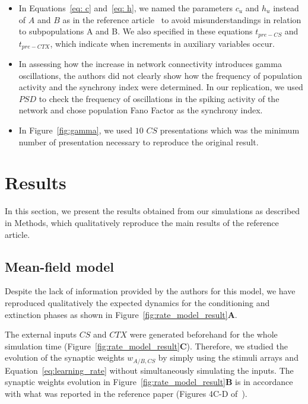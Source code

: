 \begin{itemize}
    \item In Equations~\ref{eq: c} and~\ref{eq: h}, we named the parameters $c_u$ and $h_u$ instead of $A$ and $B$ as in the reference article~\cite{Vlachos2011} to avoid misunderstandings in relation to subpopulations A and B. We also specified in these equations $t_{pre-CS}$ and $t_{pre-CTX}$, which indicate when increments in auxiliary variables occur.
    
    \item In assessing how the increase in network connectivity introduces gamma oscillations, the authors did not clearly show how the frequency of population activity and the synchrony index were determined. In our replication, we used $PSD$ to check the frequency of oscillations in the spiking activity of the network and chose population Fano Factor as the synchrony index.
    
    \item In Figure~\ref{fig:gamma}, we used $10$ $CS$ presentations which was the minimum number of presentation necessary to reproduce the original result. 
    
\end{itemize}


\FloatBarrier
\section*{Results}
In this section, we present the results obtained from our simulations as described in Methods, which qualitatively reproduce the main results of the reference article.

\subsection*{Mean-field model}

Despite the lack of information provided by the authors for this model, we have reproduced qualitatively the expected dynamics for the conditioning and extinction phases as shown in Figure~\ref{fig:rate_model_result}\textbf{A}.%

The external inputs $CS$ and $CTX$ were generated beforehand for the whole simulation time (Figure~\ref{fig:rate_model_result}\textbf{C}). Therefore, we studied the evolution of the synaptic weights $w_{A/B,CS}$ by simply using the stimuli arrays and Equation~\ref{eq:learning_rate} without simultaneously simulating the inputs. The synaptic weights evolution in Figure~\ref{fig:rate_model_result}\textbf{B} is in accordance with what was reported in the reference paper (Figures 4C-D of~\cite{Vlachos2011}).


